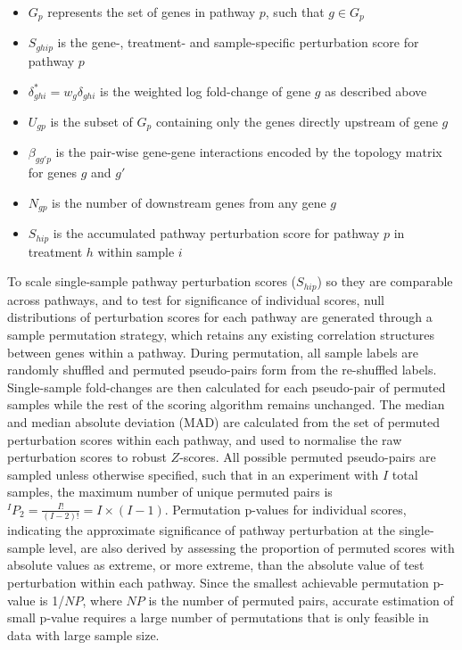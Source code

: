 \documentclass[9pt,a4paper,]{extarticle}
\begin{document}
\begin{itemize}
\item
  \(G_p\) represents the set of genes in pathway \(p\), such that \(g \in G_p\)
\item
  \(S_{ghip}\) is the gene-, treatment- and sample-specific perturbation score for pathway \(p\)
\item
  \(\delta_{ghi}^* = w_g\delta_{ghi}\) is the weighted log fold-change of gene \(g\) as described above
\item
  \(U_{gp}\) is the subset of \(G_p\) containing only the genes directly upstream of gene \(g\)
\item
  \(\beta_{gg'p}\) is the pair-wise gene-gene interactions\citep{Tarca2009} encoded by the topology matrix for genes \(g\) and \(g'\)
\item
  \(N_{gp}\) is the number of downstream genes from any gene \(g\)
\item
  \(S_{hip}\) is the accumulated pathway perturbation score for pathway \(p\) in treatment \(h\) within sample \(i\)
\end{itemize}

To scale single-sample pathway perturbation scores (\(S_{hip}\)) so they are comparable across pathways, and to test for significance of individual scores, null distributions of perturbation scores for each pathway are generated through a sample permutation strategy, which retains any existing correlation structures between genes within a pathway.
During permutation, all sample labels are randomly shuffled and permuted pseudo-pairs form from the re-shuffled labels.
Single-sample fold-changes are then calculated for each pseudo-pair of permuted samples while the rest of the scoring algorithm remains unchanged.
The median and median absolute deviation (MAD) are calculated from the set of permuted perturbation scores within each pathway, and used to normalise the raw perturbation scores to robust \(Z\)-scores.
All possible permuted pseudo-pairs are sampled unless otherwise specified, such that in an experiment with \(I\) total samples, the maximum number of unique permuted pairs is \({}^IP_2 = \frac{{I!}}{{(I-2)!}} = I \times (I-1)\).
Permutation p-values for individual scores, indicating the approximate significance of pathway perturbation at the single-sample level, are also derived by assessing the proportion of permuted scores with absolute values as extreme, or more extreme, than the absolute value of test perturbation within each pathway\citep{Theo2009}.
Since the smallest achievable permutation p-value is 1/\(NP\), where \(NP\) is the number of permuted pairs, accurate estimation of small p-value requires a large number of permutations that is only feasible in data with large sample size.
\end{document}
